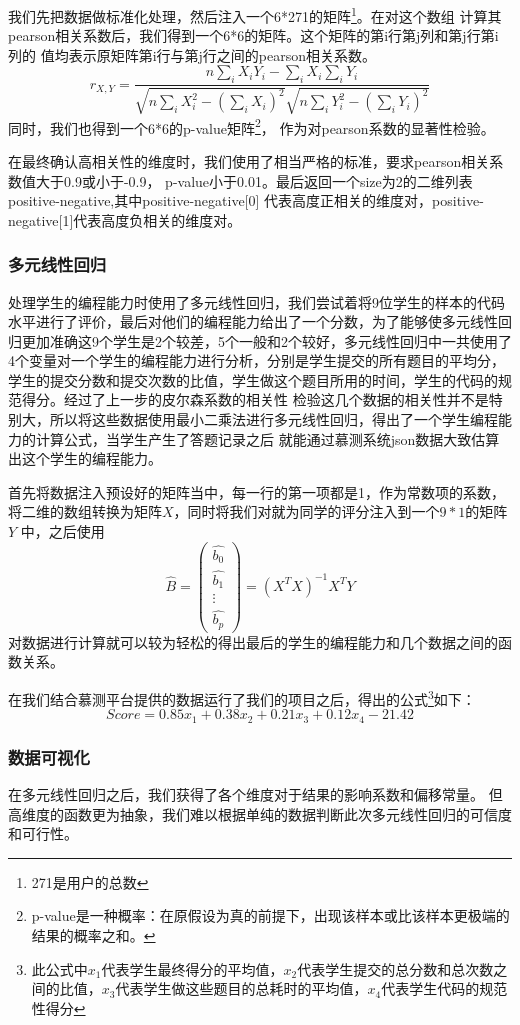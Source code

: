\documentclass[UTF8]{ctexart}
\begin{document}
我们先把数据做标准化处理，然后注入一个6*271的矩阵\footnote{271是用户的总数}。在对这个数组
计算其pearson相关系数后，我们得到一个6*6的矩阵。这个矩阵的第i行第j列和第j行第i列的
值均表示原矩阵第i行与第j行之间的pearson相关系数。$$ r_{X,Y}=\dfrac{n\sum_{i} X_iY_i-\sum_{i} X_i \sum_{i} Y_i}{\sqrt{n\sum_{i} X_i^2-(\sum_{i} X_i)^2}\sqrt{n\sum_{i} Y_i^2-(\sum_{i} Y_i)^2}} $$
同时，我们也得到一个6*6的p-value矩阵\footnote{p-value是一种概率：在原假设为真的前提下，出现该样本或比该样本更极端的结果的概率之和。}，
作为对pearson系数的显著性检验。

在最终确认高相关性的维度时，我们使用了相当严格的标准，要求pearson相关系数值大于0.9或小于-0.9，
p-value小于0.01。最后返回一个size为2的二维列表positive-negative,其中positive-negative[0]
代表高度正相关的维度对，positive-negative[1]代表高度负相关的维度对。
\subsubsection{多元线性回归}
处理学生的编程能力时使用了多元线性回归，我们尝试着将9位学生的样本的代码水平进行了评价，最后对他们的编程能力给出了一个分数，为了能够使多元线性回
归更加准确这9个学生是2个较差，5个一般和2个较好，多元线性回归中一共使用了4个变量对一个学生的编程能力进行分析，分别是学生提交的所有题目的平均分，
学生的提交分数和提交次数的比值，学生做这个题目所用的时间，学生的代码的规范得分。经过了上一步的皮尔森系数的相关性
检验这几个数据的相关性并不是特别大，所以将这些数据使用最小二乘法进行多元线性回归，得出了一个学生编程能力的计算公式，当学生产生了答题记录之后
就能通过慕测系统json数据大致估算出这个学生的编程能力。

首先将数据注入预设好的矩阵当中，每一行的第一项都是1，作为常数项的系数，将二维的数组转换为矩阵$X$，同时将我们对就为同学的评分注入到一个$9*1$的矩阵$Y$
中，之后使用\boldmath$$\hat{B}=\begin{pmatrix}
    \hat{b_0}\\\hat{b_1}\\\vdots\\\hat{b_p}
\end{pmatrix}=(X^TX)^{-1}X^TY$$\unboldmath
对数据进行计算就可以较为轻松的得出最后的学生的编程能力和几个数据之间的函数关系。

在我们结合慕测平台提供的数据运行了我们的项目之后，得出的公式\footnote{此公式中$x_1$代表学生最终得分的平均值，$x_2$代表学生提交的总分数和总次数之间的比值，$x_3$代表学生做这些题目的总耗时的平均值，$x_4$代表学生代码的规范性得分}如下：
$$Score=0.85x_1+0.38x_2+0.21x_3+0.12x_4-21.42$$
\subsubsection{数据可视化}
在多元线性回归之后，我们获得了各个维度对于结果的影响系数和偏移常量。
但高维度的函数更为抽象，我们难以根据单纯的数据判断此次多元线性回归的可信度和可行性。
\end{document}
